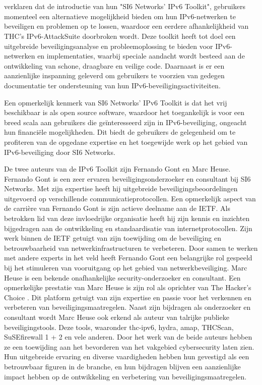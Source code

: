 \section{}%
\textcite{gont2013security} verklaren dat de introductie van hun "SI6 Networks' IPv6 Toolkit", gebruikers momenteel een alternatieve mogelijkheid bieden om hun \newline IPv6-netwerken te beveiligen en problemen op te lossen, waardoor een eerdere afhankelijkheid van THC's IPv6-AttackSuite doorbroken wordt. Deze toolkit heeft tot doel een uitgebreide beveiligingsanalyse en probleemoplossing te bieden voor IPv6-netwerken en implementaties, waarbij speciale aandacht wordt besteed aan de ontwikkeling van schone, draagbare en veilige code. Daarnaast is er een aanzienlijke inspanning geleverd om gebruikers te voorzien van gedegen documentatie ter ondersteuning van hun IPv6-beveiligingsactiviteiten.
\newline

Een opmerkelijk kenmerk van SI6 Networks' IPv6 Toolkit is dat het vrij beschikbaar is als open source software, waardoor het toegankelijk is voor een breed scala aan gebruikers die geïnteresseerd zijn in IPv6-beveiliging, ongeacht hun financiële mogelijkheden. Dit biedt de gebruikers de gelegenheid om te profiteren van de opgedane expertise en het toegewijde werk op het gebied van IPv6-beveiliging door SI6 Networks.
\newline

De twee auteurs van de IPv6 Toolkit zijn Fernando Gont en Marc Heuse. 
Fernando Gont is een zeer ervaren beveiligingsonderzoeker en consultant bij SI6 Networks. Met zijn expertise heeft hij uitgebreide beveiligingsbeoordelingen uitgevoerd op verschillende communicatieprotocollen. Een opmerkelijk aspect van de carrière van Fernando Gont is zijn actieve deelname aan de IETF. Als betrokken lid van deze invloedrijke organisatie heeft hij zijn kennis en inzichten bijgedragen aan de ontwikkeling en standaardisatie van internetprotocollen. \autocite{gont2013security} Zijn werk binnen de IETF getuigt van zijn toewijding om de beveiliging en betrouwbaarheid van netwerkinfrastructuren te verbeteren. Door samen te werken met andere experts in het veld heeft Fernando Gont een belangrijke rol gespeeld bij het stimuleren van vooruitgang op het gebied van netwerkbeveiliging.
Marc Heuse is een bekende onafhankelijke security-onderzoeker en consultant. Een opmerkelijke prestatie van Marc Heuse is zijn rol als oprichter van The Hacker's Choice . Dit platform getuigt van zijn expertise en passie voor het verkennen en verbeteren van beveiligingsmaatregelen. Naast zijn bijdragen als onderzoeker en consultant wordt Marc Heuse ook erkend als auteur van talrijke publieke beveiligingstools. Deze tools, waaronder thc-ipv6, hydra, amap, THCScan, SuSEfirewall 1 + 2 en vele anderen. \autocite{gont2013security}
Door het  werk van de beide auteurs hebben ze  een toewijding aan het bevorderen van het vakgebied cybersecurity laten zien. Hun uitgebreide ervaring en diverse vaardigheden hebben hun gevestigd als een betrouwbaar figuren in de branche, en hun bijdragen blijven een aanzienlijke impact hebben op de ontwikkeling en verbetering van beveiligingsmaatregelen.


